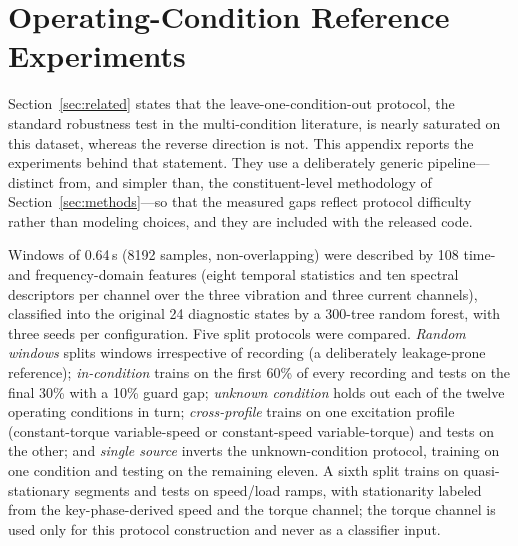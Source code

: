 \appendices
\section{Operating-Condition Reference Experiments}
\label{app:condition}

Section~\ref{sec:related} states that the leave-one-condition-out protocol,
the standard robustness test in the multi-condition literature, is nearly
saturated on this dataset, whereas the reverse direction is not. This
appendix reports the experiments behind that statement. They use a
deliberately generic pipeline---distinct from, and simpler than, the
constituent-level methodology of Section~\ref{sec:methods}---so that the
measured gaps reflect protocol difficulty rather than modeling choices, and
they are included with the released code.

Windows of 0.64\,s (8192 samples, non-overlapping) were described by 108
time- and frequency-domain features (eight temporal statistics and ten
spectral descriptors per channel over the three vibration and three current
channels), classified into the original 24 diagnostic states by a
300-tree random forest, with three seeds per configuration. Five split
protocols were compared. \emph{Random windows} splits windows irrespective
of recording (a deliberately leakage-prone reference); \emph{in-condition}
trains on the first 60\% of every recording and tests on the final 30\% with
a 10\% guard gap; \emph{unknown condition} holds out each of the twelve
operating conditions in turn; \emph{cross-profile} trains on one excitation
profile (constant-torque variable-speed or constant-speed variable-torque)
and tests on the other; and \emph{single source} inverts the unknown-condition
protocol, training on one condition and testing on the remaining eleven. A
sixth split trains on quasi-stationary segments and tests on speed/load
ramps, with stationarity labeled from the key-phase-derived speed and the
torque channel; the torque channel is used only for this protocol
construction and never as a classifier input.

